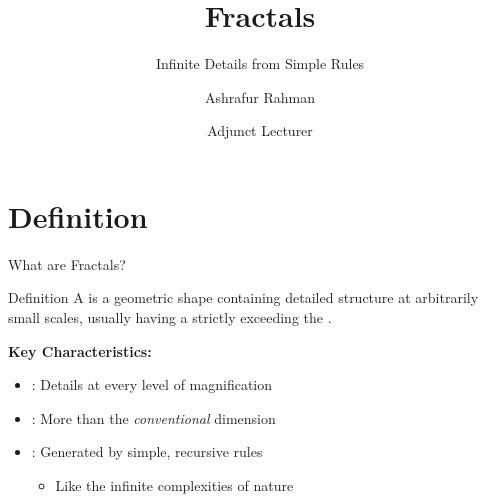 

\title{Fractals}
\subtitle{Infinite Details from Simple Rules}
\author{\large Ashrafur Rahman}
\date{\small Adjunct Lecturer}



\begin{frame}
  \titlepage
\end{frame}

\section{Definition}

\begin{frame}{What are Fractals?}
  \begin{conceptbox}{Definition}
    A  is a geometric shape containing detailed structure at arbitrarily small scales,
    usually having a  strictly exceeding the .
  \end{conceptbox}

  \vspace{0.1cm}

  \textbf{Key Characteristics:}
  \begin{itemize}
    \item {}: Details at every level of magnification
    \item {}: More than the \textit{conventional} dimension
    \item {}: Generated by simple, recursive rules
      \begin{itemize}
        \item Like the infinite complexities of nature
      \end{itemize}
  \end{itemize}

  \vspace{0.1cm}

  \pause
  \begin{center}
  \end{center}
\end{frame}

